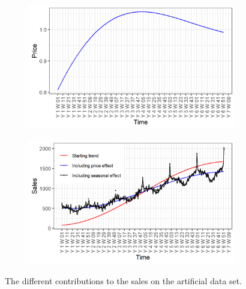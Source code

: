 \documentclass[12pt, letterpaper]{article}\usepackage[]{graphicx}\usepackage[]{color}
\begin{document}
\begin{figure}[h!]
\centering
\begin{subfigure}{0.9\textwidth}
\includegraphics[trim = {0 0 0 0}, width = \textwidth]{"figures/price.png"}
\end{subfigure}
\hfill
\begin{subfigure}{0.9\textwidth}
\includegraphics[width = \textwidth]{"figures/sales_model.png"}
\end{subfigure}
\caption{The different contributions to the sales on the artificial data set.}
\label{fig:model_data}
\end{figure}
\end{document}

